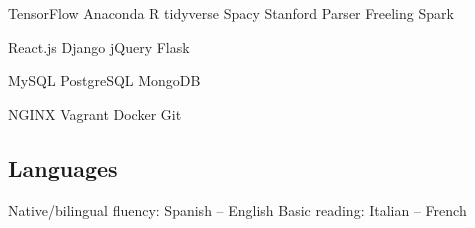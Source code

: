 \documentclass[]{deedy-resume-openfont}
\begin{document}
\descript{}
\begin{tightemize}
\item TensorFlow \textbullet{} Anaconda \textbullet{} R tidyverse \textbullet{} 
Spacy \textbullet{} Stanford Parser \textbullet{} Freeling \textbullet{} Spark
\item React.js \textbullet{} Django \textbullet{} jQuery 
\textbullet{} Flask %
\item MySQL \textbullet{} PostgreSQL \textbullet{} MongoDB %
\item NGINX \textbullet{} Vagrant \textbullet{} Docker \textbullet{} Git
\end{tightemize}
\sectionsep

\subsection{Languages}
Native/bilingual fluency: Spanish -- English \textbullet{} Basic reading: 
Italian -- French
\end{document}
